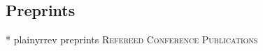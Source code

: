 \documentclass[10pt,a4paper,sans]{moderncv} %
\begin{document}

\subsection{Preprints}
\nocite{preprints}{*}
{plainyrrev}
{preprints}
{\large \textsc{Refereed Conference Publications}}




\end{document}
